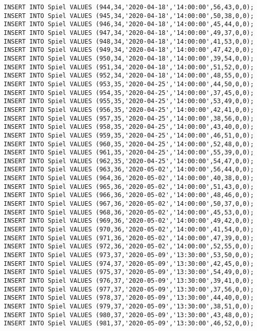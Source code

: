 \documentclass{bschlangaul-aufgabe}
\begin{document}
\begin{verbatim}
INSERT INTO Spiel VALUES (944,34,'2020-04-18','14:00:00',56,43,0,0);
INSERT INTO Spiel VALUES (945,34,'2020-04-18','14:00:00',50,38,0,0);
INSERT INTO Spiel VALUES (946,34,'2020-04-18','14:00:00',45,44,0,0);
INSERT INTO Spiel VALUES (947,34,'2020-04-18','14:00:00',49,37,0,0);
INSERT INTO Spiel VALUES (948,34,'2020-04-18','14:00:00',41,53,0,0);
INSERT INTO Spiel VALUES (949,34,'2020-04-18','14:00:00',47,42,0,0);
INSERT INTO Spiel VALUES (950,34,'2020-04-18','14:00:00',39,54,0,0);
INSERT INTO Spiel VALUES (951,34,'2020-04-18','14:00:00',51,52,0,0);
INSERT INTO Spiel VALUES (952,34,'2020-04-18','14:00:00',48,55,0,0);
INSERT INTO Spiel VALUES (953,35,'2020-04-25','14:00:00',44,50,0,0);
INSERT INTO Spiel VALUES (954,35,'2020-04-25','14:00:00',37,45,0,0);
INSERT INTO Spiel VALUES (955,35,'2020-04-25','14:00:00',53,49,0,0);
INSERT INTO Spiel VALUES (956,35,'2020-04-25','14:00:00',42,41,0,0);
INSERT INTO Spiel VALUES (957,35,'2020-04-25','14:00:00',38,56,0,0);
INSERT INTO Spiel VALUES (958,35,'2020-04-25','14:00:00',43,40,0,0);
INSERT INTO Spiel VALUES (959,35,'2020-04-25','14:00:00',46,51,0,0);
INSERT INTO Spiel VALUES (960,35,'2020-04-25','14:00:00',52,48,0,0);
INSERT INTO Spiel VALUES (961,35,'2020-04-25','14:00:00',55,39,0,0);
INSERT INTO Spiel VALUES (962,35,'2020-04-25','14:00:00',54,47,0,0);
INSERT INTO Spiel VALUES (963,36,'2020-05-02','14:00:00',56,44,0,0);
INSERT INTO Spiel VALUES (964,36,'2020-05-02','14:00:00',40,38,0,0);
INSERT INTO Spiel VALUES (965,36,'2020-05-02','14:00:00',51,43,0,0);
INSERT INTO Spiel VALUES (966,36,'2020-05-02','14:00:00',48,46,0,0);
INSERT INTO Spiel VALUES (967,36,'2020-05-02','14:00:00',50,37,0,0);
INSERT INTO Spiel VALUES (968,36,'2020-05-02','14:00:00',45,53,0,0);
INSERT INTO Spiel VALUES (969,36,'2020-05-02','14:00:00',49,42,0,0);
INSERT INTO Spiel VALUES (970,36,'2020-05-02','14:00:00',41,54,0,0);
INSERT INTO Spiel VALUES (971,36,'2020-05-02','14:00:00',47,39,0,0);
INSERT INTO Spiel VALUES (972,36,'2020-05-02','14:00:00',52,55,0,0);
INSERT INTO Spiel VALUES (973,37,'2020-05-09','13:30:00',53,50,0,0);
INSERT INTO Spiel VALUES (974,37,'2020-05-09','13:30:00',42,45,0,0);
INSERT INTO Spiel VALUES (975,37,'2020-05-09','13:30:00',54,49,0,0);
INSERT INTO Spiel VALUES (976,37,'2020-05-09','13:30:00',39,41,0,0);
INSERT INTO Spiel VALUES (977,37,'2020-05-09','13:30:00',37,56,0,0);
INSERT INTO Spiel VALUES (978,37,'2020-05-09','13:30:00',44,40,0,0);
INSERT INTO Spiel VALUES (979,37,'2020-05-09','13:30:00',38,51,0,0);
INSERT INTO Spiel VALUES (980,37,'2020-05-09','13:30:00',43,48,0,0);
INSERT INTO Spiel VALUES (981,37,'2020-05-09','13:30:00',46,52,0,0);

\end{verbatim}
\end{document}
